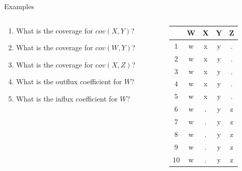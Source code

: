 \documentclass{beamer}\usepackage[]{graphicx}\usepackage[]{color}
\begin{document}
\begin{frame}{Examples}

  \begin{columns}
    \begin{column}{0.61\textwidth}

      \begin{enumerate}
      \item What is the coverage for $cov(X, Y)$?
        \vb
      \item What is the coverage for $cov(W, Y)$?
        \vb
      \item What is the coverage for $cov(X, Z)$?
        \vb
      \item What is the outflux coefficient for $W$?
        \vb
      \item What is the influx coefficient for $W$?
      \end{enumerate}

    \end{column}
    \begin{column}{0.39\textwidth}

\begin{table}[ht]
\centering
\begin{tabular}{ccccc}
  \toprule
 & W & X & Y & Z \\ 
  \midrule
1 & w & x & y & . \\ 
  2 & w & x & y & . \\ 
  3 & w & x & y & . \\ 
  4 & w & x & y & . \\ 
  5 & w & x & y & . \\ 
  6 & w & . & y & z \\ 
  7 & w & . & y & z \\ 
  8 & w & . & y & z \\ 
  9 & w & . & y & z \\ 
  10 & w & . & y & z \\ 
   \bottomrule
\end{tabular}
\end{table}


\end{column}
\end{columns}

\end{frame}

\end{document}
